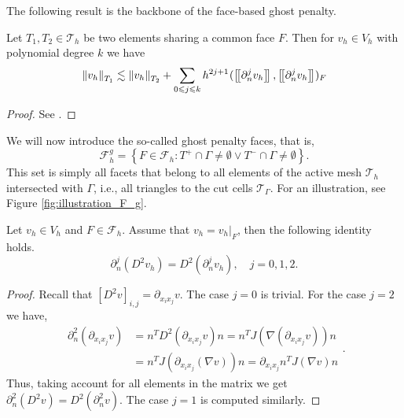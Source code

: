 The following result is the backbone of the face-based ghost penalty.
\begin{lemma}
    \label{lemma:bi_local_facet_estimate}
    Let $T_{1},T_{2 } \in  \mathcal{T} _{h}$ be two elements sharing a common face $F$. Then for $v_{h} \in V_{h}$ with polynomial degree $k$  we have
    \begin{equation}
    \| v_{h} \|_{ T_{1} }^{  }  \lesssim \| v_{h} \|_{ T_{2} }^{  } + \sum_{0\leqslant j\leqslant k}  {h^{2j +1}}^{} ( \left[\!\left[  \partial _{n}^{j} v_{h}  \right]\!\right], \left[\!\left[  \partial ^{j}_{n} v_{h}  \right]\!\right]    )_{F}
    \end{equation}

\end{lemma}
\begin{proof}
    See \cite[Lemma 2.19]{gurkan2019stabilized}.
\end{proof}

We will now introduce the so-called ghost penalty faces, that is, \[
\mathcal{F} ^{g}_{h} = \left\{ F\in \mathcal{F} _{h} : T^{+}\cap \Gamma \neq \emptyset  \vee T^{-}\cap \Gamma \neq \emptyset  \right\}.
\]
This set is simply all facets that belong to all elements of the active mesh $\mathcal{T} _{h}$  intersected with $\Gamma $, i.e., all triangles to the cut cells $\mathcal{T} _{\Gamma }$. For an illustration, see Figure \ref{fig:illustration_F_g}.

\begin{proposition}
    \label{prop:hessian_change}
    Let $v_{h} \in V_{h} $ and $F \in  \mathcal{F} _{h}$. Assume that $ v_{h} = v_{h} |_{F}$,  then the following identity holds.
    \begin{equation}
    \partial ^{j}_{n} (D^2v_{h}) = D^2 ( \partial ^{j}_{n} v_{h}), \quad  j=0,1,2.
    \end{equation}
\end{proposition}

\begin{proof}

        Recall that $\left[ D^2 v \right]_{i,j} = \partial _{x_{i}x_{j}} v $. The case $j=0$ is trivial. For the case $j=2$ we have,
        \begin{equation}
                \begin{split}
                \partial^{2} _{n} (\partial _{x_{i} x_{j}} v) & = n^{T}  D^2(\partial _{x_{i} x_{j}} v) n = n^{T}  J( \nabla (\partial _{x_{i} x_{j}}v) ) n \\
                & =  n^{T}  J(\partial _{x_{i} x_{j}}(\nabla v) ) n = \partial _{x_{i} x_{j}} n^{T} J(\nabla v) n
                \end{split}.
        \end{equation}
            Thus, taking account for all elements in the matrix we get $\partial^{2} _{n} (D^2v) = D^2( \partial^{2} _{n}v)$. The case $j=1$ is computed similarly.

\end{proof}


